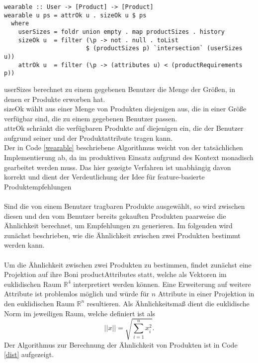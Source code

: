 \begin{lstlisting}[label=wearable,caption={Algorithmus zur Bestimmung von Produkten, die ein Benutzer tragen kann}]
wearable :: User -> [Product] -> [Product]
wearable u ps = attrOk u . sizeOk u $ ps
  where
    userSizes = foldr union empty . map productSizes . history
    sizeOk u  = filter (\p -> not . null . toList 
                       $ (productSizes p) `intersection` (userSizes u))
    attrOk u  = filter (\p -> (attributes u) < (productRequirements p))
\end{lstlisting}
\textsf{userSizes} berechnet zu einem gegebenen Benutzer die Menge der Größen, in denen er Produkte erworben hat. \\
\textsf{sizeOk} wählt aus einer Menge von Produkten diejenigen aus, die in einer Größe verfügbar sind, die zu einem gegebenen Benutzer passen.\\
\textsf{attrOk} schränkt die verfügbaren Produkte auf diejenigen ein, die der Benutzer aufgrund seiner und der Produktattribute tragen kann.
\\
Der in Code \ref{wearable} beschriebene Algorithmus weicht von der tatsächlichen Implementierung ab, da im produktiven Einsatz aufgrund des Kontext monadisch gearbeitet werden muss. Das hier gezeigte Verfahren ist unabhängig davon korrekt und dient der Verdeutlichung der Idee für feature-basierte Produktempfehlungen\\
\\
Sind die von einem Benutzer tragbaren Produkte ausgewählt, so wird zwischen diesen und den vom Benutzer bereits gekauften Produkten paarweise die Ähnlichkeit berechnet, um Empfehlungen zu generieren. Im folgenden wird zunächst be\-schrie\-ben, wie die Ähnlichkeit zwischen zwei Produkten bestimmt werden kann.\\
\\
Um die Ähnlichkeit zwischen zwei Produkten zu bestimmen, findet zunächst eine Projektion auf ihre Boni \textsf{productAttributes} statt, welche als Vektoren im euklidischen Raum $\mathbb{R}^4$ interpretiert werden können. Eine Erweiterung auf weitere Attribute ist problemlos möglich und würde für $n$ Attribute in einer Projektion in den euklidischen Raum $\mathbb{R}^n$ resultieren. Als Ähnlichkeitsmaß dient die euklidische Norm im jeweiligen Raum, welche definiert ist als
\begin{equation}
  \left|\left| x \right|\right| = \sqrt{\sum_{i=1}^n x_i^2}.
\end{equation}
Der Algorithmus zur Berechnung der Ähnlichkeit von Produkten ist in Code \ref{dist} aufgezeigt.

